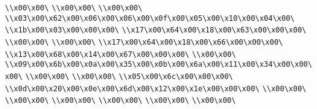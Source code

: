 \verb|\\x00\x00\|\newline
\verb|\\x00\x00\|\newline
\verb|\\x00\x00\|\newline
\verb|\\x03\x00\x62\x00\x06\x00\x06\x00\x0f\x00\x05\x00\x10\x00\x04\x00\|\newline
\verb|\\x1b\x00\x03\x00\x00\x00\|\newline
\verb|\\x17\x00\x64\x00\x18\x00\x63\x00\x00\x00\|\newline
\verb|\\x00\x00\|\newline
\verb|\\x00\x00\|\newline
\verb|\\x17\x00\x64\x00\x18\x00\x66\x00\x00\x00\|\newline
\verb|\\x13\x00\x68\x00\x14\x00\x67\x00\x00\x00\|\newline
\verb|\\x00\x00\|\newline
\verb|\\x09\x00\x6b\x00\x0a\x00\x35\x00\x0b\x00\x6a\x00\x11\x00\x34\x00\x00\x00\|\newline
\verb|\\x00\x00\|\newline
\verb|\\x00\x00\|\newline
\verb|\\x05\x00\x6c\x00\x00\x00\|\newline
\verb|\\x0d\x00\x20\x00\x0e\x00\x6d\x00\x12\x00\x1e\x00\x00\x00\|\newline
\verb|\\x00\x00\|\newline
\verb|\\x00\x00\|\newline
\verb|\\x00\x00\|\newline
\verb|\\x00\x00\|\newline
\verb|\\x00\x00\|\newline
\verb|\\x00\x00\|\newline
